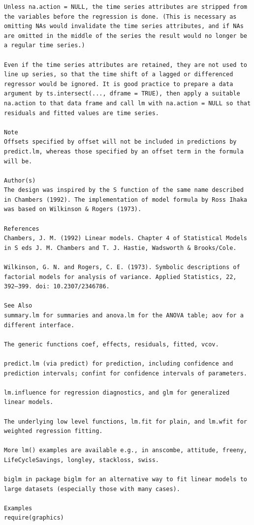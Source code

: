 \documentclass[
]{article}
\begin{document}
\begin{verbatim}
Unless na.action = NULL, the time series attributes are stripped from the variables before the regression is done. (This is necessary as omitting NAs would invalidate the time series attributes, and if NAs are omitted in the middle of the series the result would no longer be a regular time series.)

Even if the time series attributes are retained, they are not used to line up series, so that the time shift of a lagged or differenced regressor would be ignored. It is good practice to prepare a data argument by ts.intersect(..., dframe = TRUE), then apply a suitable na.action to that data frame and call lm with na.action = NULL so that residuals and fitted values are time series.

Note
Offsets specified by offset will not be included in predictions by predict.lm, whereas those specified by an offset term in the formula will be.

Author(s)
The design was inspired by the S function of the same name described in Chambers (1992). The implementation of model formula by Ross Ihaka was based on Wilkinson & Rogers (1973).

References
Chambers, J. M. (1992) Linear models. Chapter 4 of Statistical Models in S eds J. M. Chambers and T. J. Hastie, Wadsworth & Brooks/Cole.

Wilkinson, G. N. and Rogers, C. E. (1973). Symbolic descriptions of factorial models for analysis of variance. Applied Statistics, 22, 392–399. doi: 10.2307/2346786.

See Also
summary.lm for summaries and anova.lm for the ANOVA table; aov for a different interface.

The generic functions coef, effects, residuals, fitted, vcov.

predict.lm (via predict) for prediction, including confidence and prediction intervals; confint for confidence intervals of parameters.

lm.influence for regression diagnostics, and glm for generalized linear models.

The underlying low level functions, lm.fit for plain, and lm.wfit for weighted regression fitting.

More lm() examples are available e.g., in anscombe, attitude, freeny, LifeCycleSavings, longley, stackloss, swiss.

biglm in package biglm for an alternative way to fit linear models to large datasets (especially those with many cases).

Examples
require(graphics)


\end{verbatim}
\end{document}
